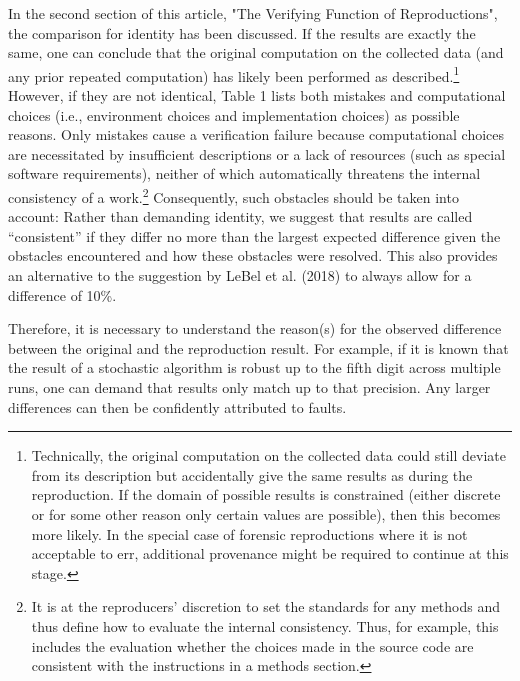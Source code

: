 \documentclass[authordate, meta]{jote-new-article}
\begin{document}
	In the second section of this article, "The Verifying Function of Reproductions", the comparison for identity has been discussed. If the results are exactly the same, one can conclude that the original computation on the collected data (and any prior repeated computation) has likely been performed as described.\footnote{ Technically, the original computation on the collected data could still deviate from its description but accidentally give the same results as during the reproduction. If the domain of possible results is constrained (either discrete or for some other reason only certain values are possible), then this becomes more likely. In the special case of forensic reproductions where it is not acceptable to err, additional provenance might be required to continue at this stage.} However, if they are not identical, Table 1 lists both mistakes and computational choices (i.e., environment choices and implementation choices) as possible reasons. Only mistakes cause a verification failure because computational choices are necessitated by insufficient descriptions or a lack of resources (such as special software requirements), neither of which automatically threatens the internal consistency of a work.\footnote{ It is at the reproducers' discretion to set the standards for any methods and thus define how to evaluate the internal consistency. Thus, for example, this includes the evaluation whether the choices made in the source code are consistent with the instructions in a methods section.} Consequently, such obstacles should be taken into account: Rather than demanding identity, we suggest that results are called “consistent” if they differ no more than the largest expected difference given the obstacles encountered and how these obstacles were resolved. This also provides an alternative to the suggestion by LeBel et al. (2018) to always allow for a difference of 10\%.



	Therefore, it is necessary to understand the reason(s) for the observed difference between the original and the reproduction result. For example, if it is known that the result of a stochastic algorithm is robust up to the fifth digit across multiple runs, one can demand that results only match up to that precision. Any larger differences can then be confidently attributed to faults.
\end{document}
